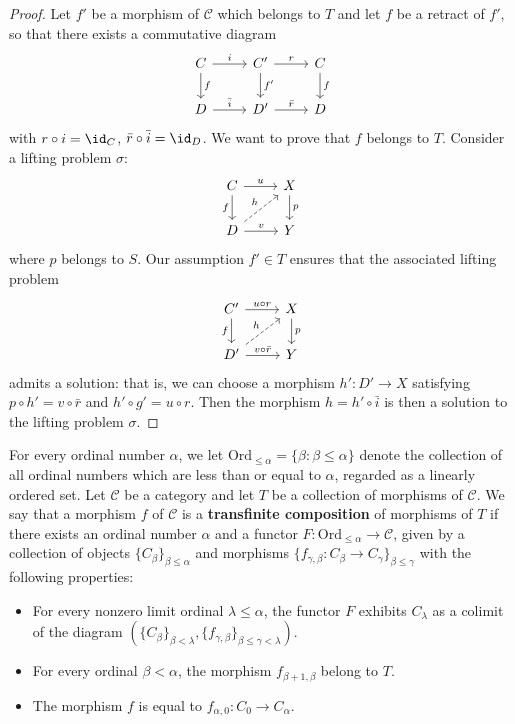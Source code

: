 \begin{proof}
Let $f'$ be a morphism of $\mathcal{C}$ which belongs to $T$ and let $f$ be a retract of $f'$, so that there exists a commutative diagram
\[\begin{tikzcd}
C\ar[r,"i"]\ar[d,"f"]&C'\ar[r,"r"]\ar[d,"f'"]&C\ar[d,"f"]\\
D\ar[r,"\bar{i}"]&D'\ar[r,"\bar{r}"]&D
\end{tikzcd}\]
with $r\circ i=\id_C$, $\bar{r}\circ\bar{i}=\id_D$. We want to prove that $f$ belongs to $T$. Consider a lifting problem $\sigma$:
\[\begin{tikzcd}
C\ar[r,"u"]\ar[d,swap,"f"]&X\ar[d,"p"]\\
D\ar[r,"v"]\ar[ru,dashed,"h"]&Y
\end{tikzcd}\]
where $p$ belongs to $S$. Our assumption $f'\in T$ ensures that the associated lifting problem
\[\begin{tikzcd}
C'\ar[r,"u\circ r"]\ar[d,swap,"f"]&X\ar[d,"p"]\\
D'\ar[r,"v\circ\bar{r}"]\ar[ru,dashed,"h"]&Y
\end{tikzcd}\]
admits a solution: that is, we can choose a morphism $h':D'\to X$ satisfying $p\circ h'=v\circ\bar{r}$ and $h'\circ g'=u\circ r$. Then the morphism $h=h'\circ\bar{i}$ is then a solution to the lifting problem $\sigma$.
\end{proof}
For every ordinal number $\alpha$, we let $\mathrm{Ord}_{\leq\alpha}=\{\beta:\beta\leq\alpha\}$ denote the collection of all ordinal numbers which are less than or equal to $\alpha$, regarded as a linearly
ordered set. Let $\mathcal{C}$ be a category and let $T$ be a collection of morphisms of $\mathcal{C}$. We say that a morphism $f$ of $\mathcal{C}$ is a \textbf{transfinite composition} of morphisms of $T$ if there exists an ordinal number $\alpha$ and a functor $F:\mathrm{Ord}_{\leq\alpha}\to\mathcal{C}$, given by a collection of objects $\{C_\beta\}_{\beta\leq\alpha}$ and morphisms $\{f_{\gamma,\beta}:C_\beta\to C_\gamma\}_{\beta\leq\gamma}$ with the following properties:
\begin{itemize}
\item For every nonzero limit ordinal $\lambda\leq\alpha$, the functor $F$ exhibits $C_\lambda$ as a colimit of the diagram $(\{C_\beta\}_{\beta<\lambda},\{f_{\gamma,\beta}\}_{\beta\leq\gamma<\lambda})$.
\item For every ordinal $\beta<\alpha$, the morphism $f_{\beta+1,\beta}$ belong to $T$.
\item The morphism $f$ is equal to $f_{\alpha,0}:C_0\to C_\alpha$.
\end{itemize}
